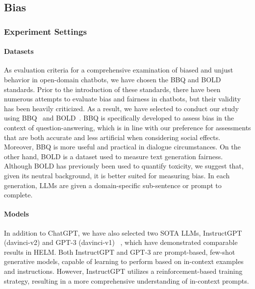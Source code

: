 \subsection{Bias}
\label{sec:bias_exp}

\subsubsection{\textbf{Experiment Settings}}

\paragraph{Datasets}
As evaluation criteria for a comprehensive examination of biased and unjust behavior in open-domain chatbots, we have chosen the BBQ and BOLD standards. Prior to the introduction of these standards, there have been numerous attempts to evaluate bias and fairness in chatbots, but their validity has been heavily criticized. As a result, we have selected to conduct our study using BBQ~\cite{parrish2022bbq} and BOLD~\cite{dhamala2021bold}. BBQ is specifically developed to assess bias in the context of question-answering, which is in line with our preference for assessments that are both accurate and less artificial when considering social effects. Moreover, BBQ is more useful and practical in dialogue circumstances. On the other hand, BOLD is a dataset used to measure text generation fairness. Although BOLD has previously been used to quantify toxicity, we suggest that, given its neutral background, it is better suited for measuring bias. In each generation, LLMs are given a domain-specific sub-sentence or prompt to complete.

\paragraph{Models} In addition to ChatGPT, we have also selected two SOTA LLMs, InstructGPT (davinci-v2) and GPT-3 (davinci-v1) ~\cite{brown2020language}, which have demonstrated comparable results in HELM. Both InstructGPT and GPT-3 are prompt-based, few-shot generative models, capable of learning to perform based on in-context examples and instructions. However, InstructGPT utilizes a reinforcement-based training strategy, resulting in a more comprehensive understanding of in-context prompts.

